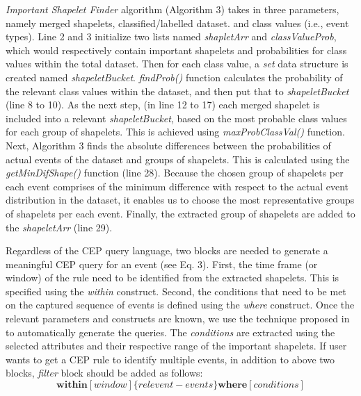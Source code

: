 \documentclass[conference]{IEEEtran}  %
\begin{document}
\textit{Important Shapelet Finder} algorithm (Algorithm 3) takes in three parameters, namely merged shapelets, classified/labelled dataset. and class values (i.e., event types). Line 2 and 3 initialize two lists named \textit{shapletArr} and \textit{classValueProb}, which would respectively contain important shapelets and probabilities for class values within the total dataset. Then for each class value, a \textit{set} data structure is created named \textit{shapeletBucket}. \textit{findProb()} function calculates the probability of the relevant class values within the dataset, and then put that to \textit{shapeletBucket} (line 8 to 10). As the next step, (in line 12 to 17) each merged shapelet is included into a relevant \textit{shapeletBucket}, based on the most probable class values for each group of shapelets. This is achieved using \textit{maxProbClassVal()} function. Next, Algorithm 3 finds the absolute differences between the probabilities of actual events of the dataset and groups of shapelets. This is calculated using the \textit{getMinDifShape()} function (line 28). Because the chosen group of shapelets per each event comprises of the minimum difference with respect to the actual event distribution in the dataset, it enables us to choose the most representative groups of shapelets per each event. Finally, the extracted group of shapelets are added to the \textit{shapeletArr} (line 29).

Regardless of the CEP query language, two blocks are needed to generate a meaningful CEP query for an event (see Eq. 3). First, the time frame (or window) of the rule need to be identified from the extracted shapelets. This is specified using the \textit{within} construct. Second, the conditions that need to be met on the captured sequence of events is defined using the \textit{where} construct. Once the relevant parameters and constructs are known, we use the technique proposed in \cite{IEEEexample:autoCEP} to automatically generate the queries.
 The \textit{conditions} are extracted using the selected attributes and their respective range of the important shapelets. If user wants to get a CEP rule to identify multiple events, in addition to above two blocks, \textit{filter} block should be added as follows:
\begin{equation}
\textbf{within}[window] \{relevent-events\} \textbf{where}[conditions]
\label{eq:releventEvents}
\end{equation}
\end{document}
